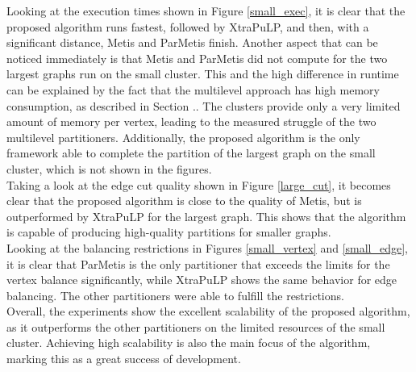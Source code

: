 \documentclass[acmsmall,nonacm,screen,review]{acmart}
\begin{document}
Looking at the execution times shown in Figure \ref{small_exec}, it is clear that the proposed algorithm runs fastest, followed by XtraPuLP, and then, with a significant distance, Metis and ParMetis finish. Another aspect that can be noticed immediately is that Metis and ParMetis did not compute for the two largest graphs run on the small cluster. This and the high difference in runtime can be explained by the fact that the multilevel approach has high memory consumption, as described in Section .. The clusters provide only a very limited amount of memory per vertex, leading to the measured struggle of the two multilevel partitioners. Additionally, the proposed algorithm is the only framework able to complete the partition of the largest graph on the small cluster, which is not shown in the figures. \\
Taking a look at the edge cut quality shown in Figure \ref{large_cut}, it becomes clear that the proposed algorithm is close to the quality of Metis, but is outperformed by XtraPuLP for the largest graph. This shows that the algorithm is capable of producing high-quality partitions for smaller graphs. \\
Looking at the balancing restrictions in Figures \ref{small_vertex} and \ref{small_edge}, it is clear that ParMetis is the only partitioner that exceeds the limits for the vertex balance significantly, while XtraPuLP shows the same behavior for edge balancing. The other partitioners were able to fulfill the restrictions. \\
Overall, the experiments show the excellent scalability of the proposed algorithm, as it outperforms the other partitioners on the limited resources of the small cluster. Achieving high scalability is also the main focus of the algorithm, marking this as a great success of development.
\end{document}
